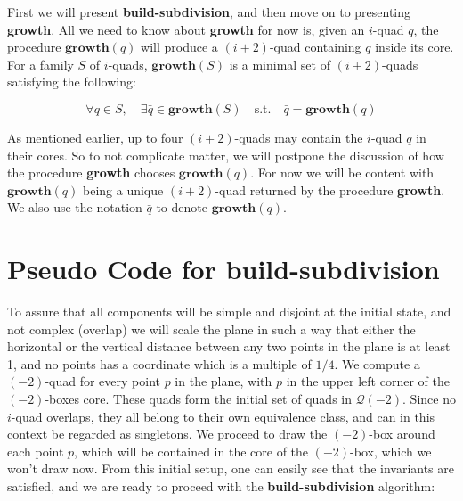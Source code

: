 First we will present \textbf{build-subdivision}, and then move on to presenting \textbf{growth}. 
All we need to know about \textbf{growth} for now is, given an $i$-quad $q$, the procedure 
$\mathbf{growth}(q)$ will produce a $(i+2)$-quad containing $q$ inside its core. For a family 
$S$ of $i$-quads, $\mathbf{growth}(S)$ is a minimal set of $(i+2)$-quads satisfying the following:

$$\forall q \in S, \quad \exists \bar{q} \in \mathbf{growth}(S) \quad \text{s.t.} \quad \bar{q} 
= \mathbf{growth}(q)$$

As mentioned earlier, up to four $(i+2)$-quads may contain the $i$-quad $q$ in their cores. So 
to not complicate matter, we will postpone the discussion of how the procedure \textbf{growth} 
chooses $\mathbf{growth}(q)$. For now we will be content with $\mathbf{growth}(q)$ being a 
unique $(i+2)$-quad returned by the procedure \textbf{growth}. We also use the notation $\bar{q}$ 
to denote $\mathbf{growth}(q)$.

\section{Pseudo Code for \textbf{build-subdivision}}

To assure that all components will be simple and disjoint at the initial state, and not complex 
(overlap) we will scale the plane in such a way that either the horizontal or the vertical 
distance between any two points in the plane is at least 1, and no points has a coordinate which 
is a multiple of $1/4$. We compute a $(-2)$-quad for every point $p$ in the plane, with $p$ in 
the upper left corner of the $(-2)$-boxes core. These quads form the initial set of quads in 
$\mathcal{Q}(-2)$. Since no $i$-quad overlaps, they all belong to their own equivalence class, 
and can in this context be regarded as singletons. We proceed to draw the $(-2)$-box around 
each point $p$, which will be contained in the core of the $(-2)$-box, which we won't draw now. 
From this initial setup, one can easily see that the invariants are satisfied, and we are ready 
to proceed with the \textbf{build-subdivision} algorithm:

